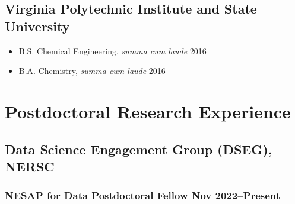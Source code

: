 \documentclass[11pt]{article} %
\begin{document}
\subsection{Virginia Polytechnic Institute and State University }
\begin{itemize}
  \item B.S. Chemical Engineering, \textit{summa cum laude} \hfill 2016
  \item B.A. Chemistry, \textit{summa cum laude} \hfill 2016
\end{itemize}

\section{Postdoctoral Research Experience}

\subsection{Data Science Engagement Group (DSEG), NERSC}

\subsubsection{NESAP for Data Postdoctoral Fellow \hfill Nov 2022--Present}
\end{document}
